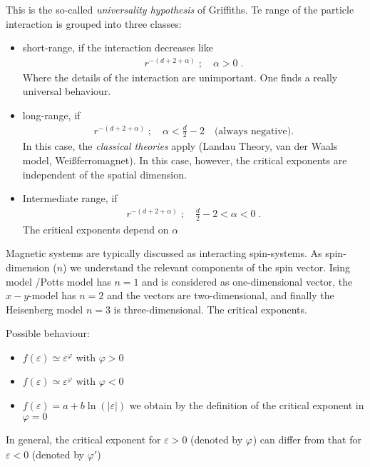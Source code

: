 This is the so-called {\em universality hypothesis} of Griffiths.
Te range of the particle interaction is grouped into three classes:
\begin{itemize}
	\item short-range, if the interaction decreases like
%
\begin{align*}
r^{-(d+2+\alpha)}\;;\quad \alpha > 0\;.
\end{align*}
%
Where the details of the interaction are unimportant.
One finds a really universal behaviour.
\item  long-range, if  
%
\begin{align*}
r^{-(d+2+\alpha)}\;;\quad \alpha< \frac{d}{2}-2\quad\text{(always negative)}.
\end{align*}
%  
In this case, the {\em classical theories} apply (Landau Theory, van der Waals model, Weißferromagnet). In this case, however, the critical exponents are independent of the spatial dimension. 
 \item Intermediate range, if 
\begin{align*}
r^{-(d+2+\alpha)}\;;\quad \frac{d}{2}-2 < \alpha < 0\;.
\end{align*}
%
The critical exponents depend on $\alpha$
\end{itemize}


Magnetic systems are typically discussed as interacting spin-systems. As spin-dimension ($n$) we understand the relevant components of the spin vector. Ising model /Potts model has $n=1$ and is considered as one-dimensional vector, the $x-y$-model has $n=2$ and the vectors are two-dimensional, and finally the Heisenberg model $n=3$ is three-dimensional. The critical exponents.



Possible behaviour:

\begin{itemize}
	\item{} $f(\varepsilon)\simeq \varepsilon^{\varphi}$ with $\varphi >0$
	\item{} $f(\varepsilon)\simeq \varepsilon^{\varphi}$ with $\varphi <0$ 
	\item{} $f(\varepsilon) = a + b\ln(|\varepsilon|)$ we obtain by
	the definition of the critical exponent in  $\varphi =0$ 
\end{itemize}
In general, the critical exponent for $\varepsilon>0$ (denoted by $\varphi_{}$) can differ from that for $\varepsilon<0$ (denoted by $\varphi'$)

